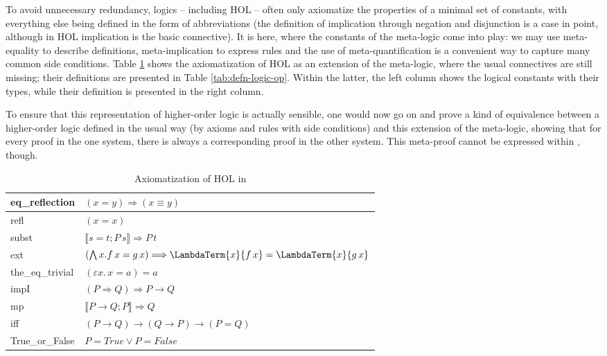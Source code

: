 To avoid unnecessary redundancy, logics -- including HOL -- often only
axiomatize the properties of a minimal set of constants, with everything else
being defined in the form of abbreviations (the definition of implication
through negation and disjunction is a case in point, although in HOL implication
is the basic connective). It is here, where the constants of the meta-logic come
into play: we may use meta-equality to describe definitions, meta-implication to
express rules and the use of meta-quantification is a convenient way to capture
many common side conditions. Table \ref{tab:axioms-hol} shows the axiomatization
of HOL as an extension of the meta-logic, where the usual connectives are still
missing; their definitions are presented in Table \ref{tab:defn-logic-op}.
Within the latter, the left column shows the logical constants with their types,
while their definition is presented in the right column.

\begin{rem}
  To ensure that this representation of higher-order logic is actually sensible,
  one would now go on and prove a kind of equivalence between a higher-order
  logic defined in the usual way (by axioms and rules with side conditions) and
  this extension of the meta-logic, showing that for every proof in the one
  system, there is always a corresponding proof in the other system. This
  meta-proof cannot be expressed within \Isabelle, though.
\end{rem}

\begin{table}
  \centering \renewcommand{\arraystretch}{1.3}
  \begin{tabular}{|l@{$\quad$}l|}\hline
    eq\_reflection & $(x = y) \Longrightarrow (x \equiv y)$ \\\hline
    refl          & $(x  = x)$ \\\hline
    subst         & $\llbracket s = t; P\, s\rrbracket \Longrightarrow P\, t$ \\\hline
    ext           & $(\bigwedge x. f\,x = g\,x) \Longrightarrow \LambdaTerm{x}{f\,x} =
    \LambdaTerm{x}{g\,x}$ \\\hline
    the\_eq\_trivial & $(\varepsilon x.\,x=a) = a$ \\\hline
    impI          & $(P \Longrightarrow Q) \Longrightarrow P \longrightarrow Q$ \\\hline
    mp            & $\llbracket P \longrightarrow Q; P\rrbracket \Longrightarrow Q$ \\\hline
    iff           & $(P\longrightarrow Q) \longrightarrow (Q\longrightarrow P)\longrightarrow (P=Q)$\\\hline
    True\_or\_False & $P = True \lor P = False$ \\\hline
  \end{tabular}
  \caption{Axiomatization of HOL in \Isabelle}
  \label{tab:axioms-hol}
\end{table}

